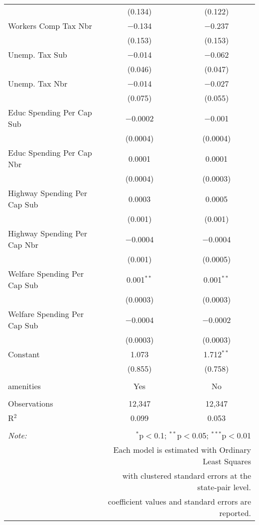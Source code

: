 \begin{table}[!htbp]
\begin{tabular}{@{\extracolsep{5pt}}lcc}
  & (0.134) & (0.122) \\ 
  Workers Comp Tax Nbr & $-$0.134 & $-$0.237 \\ 
  & (0.153) & (0.153) \\ 
  Unemp. Tax Sub & $-$0.014 & $-$0.062 \\ 
  & (0.046) & (0.047) \\ 
  Unemp. Tax Nbr & $-$0.014 & $-$0.027 \\ 
  & (0.075) & (0.055) \\ 
  Educ Spending Per Cap Sub & $-$0.0002 & $-$0.001 \\ 
  & (0.0004) & (0.0004) \\ 
  Educ Spending Per Cap Nbr & 0.0001 & 0.0001 \\ 
  & (0.0004) & (0.0003) \\ 
  Highway Spending Per Cap Sub & 0.0003 & 0.0005 \\ 
  & (0.001) & (0.001) \\ 
  Highway Spending Per Cap Nbr & $-$0.0004 & $-$0.0004 \\ 
  & (0.001) & (0.0005) \\ 
  Welfare Spending Per Cap Sub & 0.001$^{**}$ & 0.001$^{**}$ \\ 
  & (0.0003) & (0.0003) \\ 
  Welfare Spending Per Cap Sub & $-$0.0004 & $-$0.0002 \\ 
  & (0.0003) & (0.0003) \\ 
  Constant & 1.073 & 1.712$^{**}$ \\ 
  & (0.855) & (0.758) \\ 
 \hline \\[-1.8ex] 
amenities & Yes & No \\ 
\hline \\[-1.8ex] 
Observations & 12,347 & 12,347 \\ 
R$^{2}$ & 0.099 & 0.053 \\ 
\hline 
\hline \\[-1.8ex] 
\textit{Note:}  & \multicolumn{2}{r}{$^{*}$p$<$0.1; $^{**}$p$<$0.05; $^{***}$p$<$0.01} \\ 
 & \multicolumn{2}{r}{Each model is estimated with Ordinary Least Squares} \\ 
 & \multicolumn{2}{r}{with clustered standard errors at the state-pair level.} \\ 
 & \multicolumn{2}{r}{coefficient values and standard errors are reported.} \\ 
\end{tabular} 
\end{table} 
